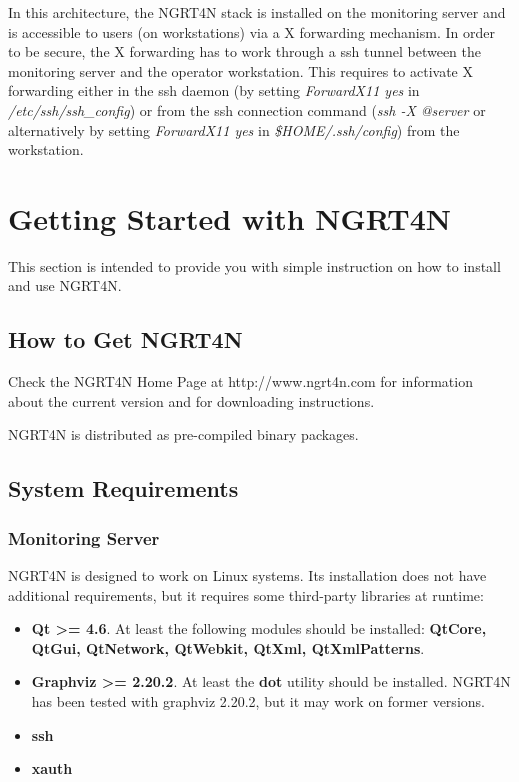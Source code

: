 \documentclass[a4paper,9pt]{article}
\begin{document}
In this architecture, the NGRT4N stack is installed on the monitoring server and is accessible to users (on workstations) via a X forwarding mechanism. In order to be secure, the X forwarding has to work through a ssh tunnel between the monitoring server and the operator workstation. This requires to activate X forwarding either in the ssh daemon (by setting \emph{ForwardX11 yes} in \emph{/etc/ssh/ssh\_config}) or from the ssh connection command (\emph{ssh -X @server} or alternatively by setting \emph{ForwardX11 yes} in \emph{\$HOME/.ssh/config}) from the workstation.   



\chapter{Getting Started with NGRT4N}
This section is intended to provide you with simple instruction on how to install and use NGRT4N.

\section{How to Get NGRT4N}
Check the NGRT4N Home Page at http://www.ngrt4n.com for information about the current version and for downloading instructions.

NGRT4N is distributed as pre-compiled binary packages. 

\section{System Requirements}
\label{systemreq}
\subsection{Monitoring Server}
NGRT4N is designed to work on Linux systems. 
Its installation does not have additional requirements, but it requires some third-party libraries at runtime:
\begin{itemize}
\item {\bf Qt >= 4.6}. At least the following modules should be installed: {\bf QtCore, QtGui, QtNetwork, QtWebkit, QtXml, QtXmlPatterns}. 
\item {\bf Graphviz >= 2.20.2}. At least the {\bf dot} utility should be installed. NGRT4N has been tested with graphviz 2.20.2, but it may work on former versions.
\item {\bf ssh}
\item {\bf xauth}
\end{itemize}
\end{document}
